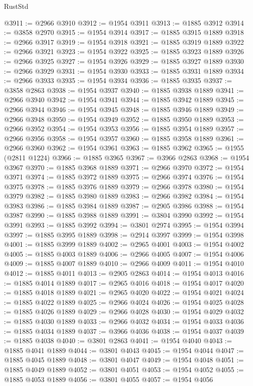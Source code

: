 \begin{lexlean}{RustStd}
\begin{coremodule}
@3911 := @2966 @3910
@3912 := @1954 @3911
@3913 := @1885 @3912
@3914 := @3858 @2970
@3915 := @1954 @3914
@3917 := @1885 @3915 @1889
@3918 := @2966 @3917
@3919 := @1954 @3918
@3921 := @1885 @3919 @1889
@3922 := @2966 @3921
@3923 := @1954 @3922
@3925 := @1885 @3923 @1889
@3926 := @2966 @3925
@3927 := @1954 @3926
@3929 := @1885 @3927 @1889
@3930 := @2966 @3929
@3931 := @1954 @3930
@3933 := @1885 @3931 @1889
@3934 := @2966 @3933
@3935 := @1954 @3934
@3936 := @1885 @3935
@3937 := @3858 @2863
@3938 := @1954 @3937
@3940 := @1885 @3938 @1889
@3941 := @2966 @3940
@3942 := @1954 @3941
@3944 := @1885 @3942 @1889
@3945 := @2966 @3944
@3946 := @1954 @3945
@3948 := @1885 @3946 @1889
@3949 := @2966 @3948
@3950 := @1954 @3949
@3952 := @1885 @3950 @1889
@3953 := @2966 @3952
@3954 := @1954 @3953
@3956 := @1885 @3954 @1889
@3957 := @2966 @3956
@3958 := @1954 @3957
@3960 := @1885 @3958 @1889
@3961 := @2966 @3960
@3962 := @1954 @3961
@3963 := @1885 @3962
@3965 := @1955 (@2811 @1224)
@3966 := @1885 @3965
@3967 := @3966 @2863
@3968 := @1954 @3967
@3970 := @1885 @3968 @1889
@3971 := @2966 @3970
@3972 := @1954 @3971
@3974 := @1885 @3972 @1889
@3975 := @2966 @3974
@3976 := @1954 @3975
@3978 := @1885 @3976 @1889
@3979 := @2966 @3978
@3980 := @1954 @3979
@3982 := @1885 @3980 @1889
@3983 := @2966 @3982
@3984 := @1954 @3983
@3986 := @1885 @3984 @1889
@3987 := @2905 @3986
@3988 := @1954 @3987
@3990 := @1885 @3988 @1889
@3991 := @3804 @3990
@3992 := @1954 @3991
@3993 := @1885 @3992
@3994 := @3801 @2974
@3995 := @1954 @3994
@3997 := @1885 @3995 @1889
@3998 := @2914 @3997
@3999 := @1954 @3998
@4001 := @1885 @3999 @1889
@4002 := @2965 @4001
@4003 := @1954 @4002
@4005 := @1885 @4003 @1889
@4006 := @2966 @4005
@4007 := @1954 @4006
@4009 := @1885 @4007 @1889
@4010 := @2966 @4009
@4011 := @1954 @4010
@4012 := @1885 @4011
@4013 := @2905 @2863
@4014 := @1954 @4013
@4016 := @1885 @4014 @1889
@4017 := @2965 @4016
@4018 := @1954 @4017
@4020 := @1885 @4018 @1889
@4021 := @2965 @4020
@4022 := @1954 @4021
@4024 := @1885 @4022 @1889
@4025 := @2966 @4024
@4026 := @1954 @4025
@4028 := @1885 @4026 @1889
@4029 := @2966 @4028
@4030 := @1954 @4029
@4032 := @1885 @4030 @1889
@4033 := @2966 @4032
@4034 := @1954 @4033
@4036 := @1885 @4034 @1889
@4037 := @3966 @4036
@4038 := @1954 @4037
@4039 := @1885 @4038
@4040 := @3801 @2863
@4041 := @1954 @4040
@4043 := @1885 @4041 @1889
@4044 := @3801 @4043
@4045 := @1954 @4044
@4047 := @1885 @4045 @1889
@4048 := @3801 @4047
@4049 := @1954 @4048
@4051 := @1885 @4049 @1889
@4052 := @3801 @4051
@4053 := @1954 @4052
@4055 := @1885 @4053 @1889
@4056 := @3801 @4055
@4057 := @1954 @4056

\end{coremodule}
\end{lexlean}
